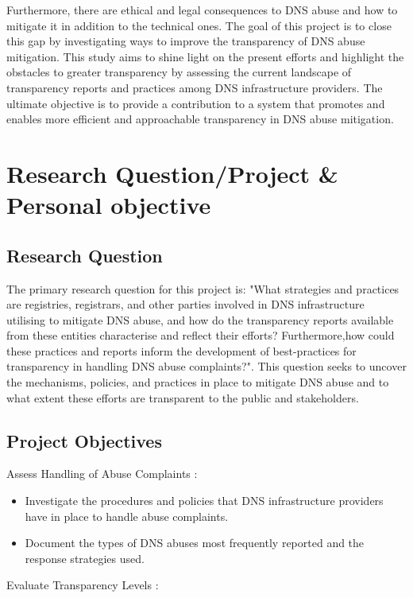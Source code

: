 Furthermore, there are ethical and legal consequences to DNS abuse and how to mitigate it in addition to the technical ones. The goal of this project is to close this gap by investigating ways to improve the transparency of DNS abuse mitigation. This study aims to shine light on the present efforts and highlight the obstacles to greater transparency by assessing the current landscape of transparency reports and practices among DNS infrastructure providers. The ultimate objective is to provide a contribution to a system that promotes and enables more efficient and approachable transparency in DNS abuse mitigation.


\section{Research Question/Project \& Personal objective} 
\subsection{Research Question}

The primary research question for this project is: "What strategies and practices are registries, registrars, and other parties involved in DNS infrastructure utilising to mitigate DNS abuse, and how do the transparency reports available from these entities characterise and reflect their efforts? Furthermore,how could these practices and reports inform the development of best-practices for transparency in handling DNS abuse complaints?". This question seeks to uncover the mechanisms, policies, and practices in place to mitigate DNS abuse and to what extent these efforts are transparent to the public and stakeholders.

\subsection{Project Objectives}

Assess Handling of Abuse Complaints :

\begin{itemize}
  \item Investigate the procedures and policies that DNS infrastructure providers have in place to handle abuse complaints.
  \item Document the types of DNS abuses most frequently reported and the response strategies used.
\end{itemize}

Evaluate Transparency Levels :

